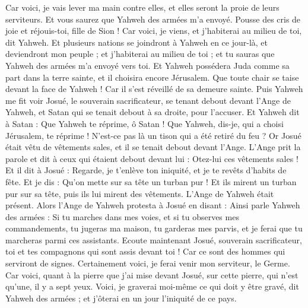 \begin{multicols}{2}
Car voici, je vais lever ma main contre elles, et elles seront la proie de leurs serviteurs. Et vous saurez que Yahweh des armées m'a envoyé.
Pousse des cris de joie et réjouis-toi, fille de Sion ! Car voici, je viens, et j'habiterai au milieu de toi, dit Yahweh.
Et plusieurs nations se joindront à Yahweh en ce jour-là, et deviendront mon peuple ; et j'habiterai au milieu de toi ; et tu sauras que Yahweh des armées m'a envoyé vers toi.
Et Yahweh possédera Juda comme sa part dans la terre sainte, et il choisira encore Jérusalem.
Que toute chair se taise devant la face de Yahweh ! Car il s'est réveillé de sa demeure sainte.
\VerseOne{}Puis Yahweh me fit voir Josué, le souverain sacrificateur, se tenant debout devant l'Ange de Yahweh, et Satan qui se tenait debout à sa droite, pour l'accuser.
Et Yahweh dit à Satan : Que Yahweh te réprime, ô Satan ! Que Yahweh, dis-je, qui a choisi Jérusalem, te réprime ! N'est-ce pas là un tison qui a été retiré du feu ?
Or Josué était vêtu de vêtements sales, et il se tenait debout devant l'Ange.
L'Ange prit la parole et dit à ceux qui étaient debout devant lui : Otez-lui ces vêtements sales ! Et il dit à Josué : Regarde, je t'enlève ton iniquité, et je te revêts d'habits de fête.
Et je dis : Qu'on mette sur sa tête un turban pur ! Et ils mirent un turban pur sur sa tête, puis ils lui mirent des vêtements. L'Ange de Yahweh était présent.
Alors l'Ange de Yahweh protesta à Josué en disant :
Ainsi parle Yahweh des armées : Si tu marches dans mes voies, et si tu observes mes commandements, tu jugeras ma maison, tu garderas mes parvis, et je ferai que tu marcheras parmi ces assistants.
Ecoute maintenant Josué, souverain sacrificateur, toi et tes compagnons qui sont assis devant toi ! Car ce sont des hommes qui serviront de signes. Certainement voici, je ferai venir mon serviteur, le Germe.
Car voici, quant à la pierre que j'ai mise devant Josué, sur cette pierre, qui n'est qu'une, il y a sept yeux. Voici, je graverai moi-même ce qui doit y être gravé, dit Yahweh des armées ; et j'ôterai en un jour l'iniquité de ce pays.

\end{multicols}
